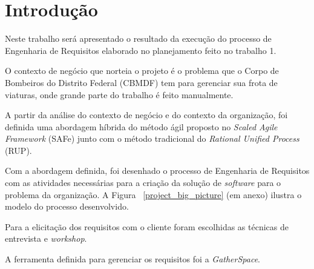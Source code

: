 \chapter[Introdução]{Introdução}
  
  
  Neste trabalho será apresentado o resultado da execução do processo de Engenharia de Requisitos elaborado no
  planejamento feito no trabalho 1.
  
  O contexto de negócio que norteia o projeto é o problema que o Corpo de Bombeiros do Distrito Federal (CBMDF)
  tem para gerenciar sua frota de viaturas, onde grande parte do trabalho é feito manualmente.
  
  A partir da análise do contexto de negócio e do contexto da organização, foi definida uma abordagem híbrida do método
  ágil proposto no \textit{Scaled Agile Framework} (SAFe) junto com o método tradicional do \textit{Rational Unified Process} (RUP).
  
  Com a abordagem definida, foi desenhado o processo de Engenharia de Requisitos com as atividades necessárias para a criação da
  solução de \textit{software} para o problema da organização. A Figura ~\ref{project_big_picture} (em anexo) ilustra o modelo do
  processo desenvolvido.
  
  Para a elicitação dos requisitos com o cliente foram escolhidas as técnicas de entrevista e \textit{workshop}.
  
  A ferramenta definida para gerenciar os requisitos foi a \textit{GatherSpace}.
  
  \vfill
  
  